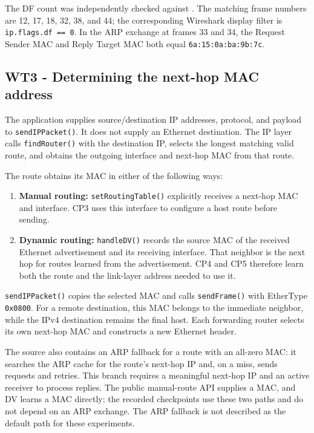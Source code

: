 \documentclass[
  a4paper,
  10pt]{article}
\providecommand{\tightlist}{%
  \setlength{\itemsep}{0pt}\setlength{\parskip}{0pt}}
\begin{document}
The DF count was independently checked against
{\ttfamily{}}. The matching frame numbers are
12, 17, 18, 32, 38, and 44; the corresponding Wireshark display filter
is \texttt{ip.flags.df\ ==\ 0}. In the ARP exchange at frames 33 and 34,
the Request Sender MAC and Reply Target MAC both equal
\texttt{6a:15:0a:ba:9b:7c}.

\newpage

\subsection{WT3 - Determining the next-hop MAC
address}\label{wt3---determining-the-next-hop-mac-address}

The application supplies source/destination IP addresses, protocol, and
payload to \texttt{sendIPPacket()}. It does not supply an Ethernet
destination. The IP layer calls \texttt{findRouter()} with the
destination IP, selects the longest matching valid route, and obtains
the outgoing interface and next-hop MAC from that route.

The route obtains its MAC in either of the following ways:

\begin{enumerate}
\def\labelenumi{\arabic{enumi}.}
\tightlist
\item
  \textbf{Manual routing:} \texttt{setRoutingTable()} explicitly
  receives a next-hop MAC and interface. CP3 uses this interface to
  configure a host route before sending.
\item
  \textbf{Dynamic routing:} \texttt{handleDV()} records the source MAC
  of the received Ethernet advertisement and its receiving interface.
  That neighbor is the next hop for routes learned from the
  advertisement. CP4 and CP5 therefore learn both the route and the
  link-layer address needed to use it.
\end{enumerate}

\texttt{sendIPPacket()} copies the selected MAC and calls
\texttt{sendFrame()} with EtherType \texttt{0x0800}. For a remote
destination, this MAC belongs to the immediate neighbor, while the IPv4
destination remains the final host. Each forwarding router selects its
own next-hop MAC and constructs a new Ethernet header.

The source also contains an ARP fallback for a route with an all-zero
MAC: it searches the ARP cache for the route's next-hop IP and, on a
miss, sends requests and retries. This branch requires a meaningful
next-hop IP and an active receiver to process replies. The public
manual-route API supplies a MAC, and DV learns a MAC directly; the
recorded checkpoints use these two paths and do not depend on an ARP
exchange. The ARP fallback is not described as the default path for
these experiments.
\end{document}
